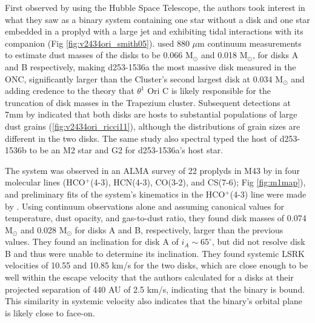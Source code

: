 \begin{figure}[htp]
  \hspace*{\fill}%
  \hfill%
  \hfill%
  \hfill%
  \hspace*{\fill}%
\end{figure}

First observed by \citet{Smith2005} using the Hubble Space Telescope, the authors took interest in what they saw as a binary system containing one star without a disk and one star embedded in a proplyd with a large jet and exhibiting tidal interactions with its companion (Fig \ref{fig:v2434ori_smith05}). \citet{MannWilliams2009} used 880 $\mu$m continuum measurements to estimate dust masses of the disks to be 0.066 M$_{\odot}$ and 0.018 M$_{\odot}$, for disks A and B respectively, making d253-1536a the most massive disk measured in the ONC, significantly larger than the Cluster's second largest disk at 0.034 M$_\odot$ and adding credence to the theory that $\theta^1$ Ori C is likely responsible for the truncation of disk masses in the Trapezium cluster. Subsequent detections at 7mm by \cite{Ricci2011} indicated that both disks are hosts to substantial populations of large dust grains (\ref{fig:v2434ori_ricci11}), although the distributions of grain sizes are different in the two disks. The same study also spectral typed the host of d253-1536b to be an M2 star and G2 for d253-1536a's host star.

The system was observed in an ALMA survey of 22 proplyds in M43 by \citet{Mann2014} in four molecular lines (HCO$^+$(4-3), HCN(4-3), CO(3-2), and CS(7-6); Fig \ref{fig:m1map}), and preliminary fits of the system's kinematics in the HCO$^+$(4-3) line were made by \citet{Williams2014}. Using continuum observations alone and assuming canonical values for temperature, dust opacity, and gas-to-dust ratio, they found disk masses of 0.074 M$_{\odot}$ and 0.028 M$_{\odot}$ for disks A and B, respectively, larger than the previous values. They found an inclination for disk A of $i_A \sim 65^\circ$, but did not resolve disk B and thus were unable to determine its inclination. They found systemic LSRK velocities of 10.55 and 10.85 km/s for the two disks, which are close enough to be well within the escape velocity that the authors calculated for a disks at their projected separation of 440 AU of 2.5 km/s, indicating that the binary is bound. This similarity in systemic velocity also indicates that the binary's orbital plane is likely close to face-on.

